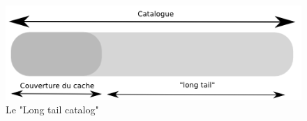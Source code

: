 {  \begin{figure}[ht]
    \begin{center}
      \includegraphics[scale=0.3]{img/long-tail-catalog.png}
      \caption{Le "Long tail catalog"}
      \label{long-tail-catalog}
    \end{center}
  \end{figure}
}


